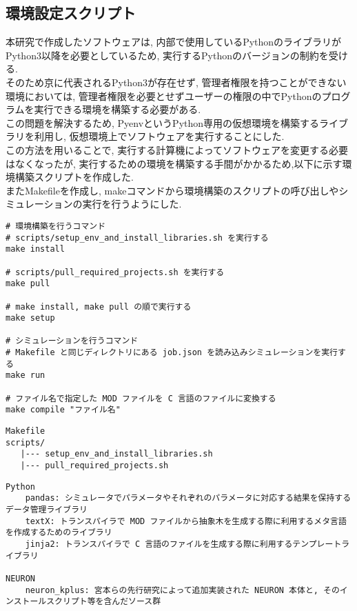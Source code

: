 \subsection{環境設定スクリプト}
本研究で作成したソフトウェアは, 内部で使用しているPythonのライブラリがPython3以降を必要としているため,
実行するPythonのバージョンの制約を受ける.\\
そのため京に代表されるPython3が存在せず, 管理者権限を持つことができない環境においては,
管理者権限を必要とせずユーザーの権限の中でPythonのプログラムを実行できる環境を構築する必要がある.\\
この問題を解決するため, Pyenv\cite{pyenv-repo}というPython専用の仮想環境を構築するライブラリを利用し,
仮想環境上でソフトウェアを実行することにした.\\
この方法を用いることで, 実行する計算機によってソフトウェアを変更する必要はなくなったが,
実行するための環境を構築する手間がかかるため,以下に示す環境構築スクリプトを作成した.\\
またMakefileを作成し, makeコマンドから環境構築のスクリプトの呼び出しやシミュレーションの実行を行うようにした.\\
{\footnotesize
\begin{lstlisting}[numbers=none, caption=利用するmakeコマンド]
# 環境構築を行うコマンド
# scripts/setup_env_and_install_libraries.sh を実行する
make install

# scripts/pull_required_projects.sh を実行する
make pull

# make install, make pull の順で実行する
make setup

# シミュレーションを行うコマンド
# Makefile と同じディレクトリにある job.json を読み込みシミュレーションを実行する
make run

# ファイル名で指定した MOD ファイルを C 言語のファイルに変換する
make compile "ファイル名"
\end{lstlisting}
}

{\footnotesize
\begin{lstlisting}[numbers=none, caption=環境構築スクリプトのフォルダ構成]
Makefile
scripts/
   |--- setup_env_and_install_libraries.sh
   |--- pull_required_projects.sh
\end{lstlisting}
}

{\footnotesize
\begin{lstlisting}[numbers=none, caption=必要なライブラリ]
Python
    pandas: シミュレータでパラメータやそれぞれのパラメータに対応する結果を保持するデータ管理ライブラリ
    textX: トランスパイラで MOD ファイルから抽象木を生成する際に利用するメタ言語を作成するためのライブラリ
    jinja2: トランスパイラで C 言語のファイルを生成する際に利用するテンプレートライブラリ

NEURON
    neuron_kplus: 宮本らの先行研究によって追加実装された NEURON 本体と, そのインストールスクリプト等を含んだソース群
\end{lstlisting}
}

{\footnotesize

}

{\footnotesize

}
